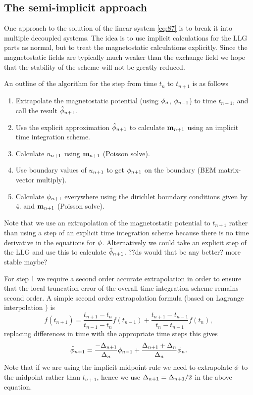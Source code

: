 \subsection{The semi-implicit approach}
\label{sec:semi-implicit-bem}

One approach to the solution of the linear system \cref{eq:87} is to break it into multiple decoupled systems.
The idea is to use implicit calculations for the LLG parts as normal, but to treat the magnetostatic calculations explicitly.
Since the magnetostatic fields are typically much weaker than the exchange field we hope that the stability of the scheme will not be greatly reduced.

An outline of the algorithm for the step from time $t_n$ to $t_{n+1}$ is as follows
\begin{enumerate}
\item Extrapolate the magnetostatic potential (using $\phi_n$, $\phi_{n-1}$) to time $t_{n+1}$, and call the result $\hat{\phi}_{n+1}$.
\item Use the explicit approximation $\hat{\phi}_{n+1}$ to calculate $\boldsymbol{\mathrm{m}}_{n+1}$ using an implicit time integration scheme.
\item Calculate $u_{n+1}$ using $\boldsymbol{\mathrm{m}}_{n+1}$ (Poisson solve).
\item Use boundary values of $u_{n+1}$ to get $\phi_{n+1}$ on the boundary (BEM matrix-vector multiply).
\item Calculate $\phi_{n+1}$ everywhere using the dirichlet boundary conditions given by 4. and $\boldsymbol{\mathrm{m}}_{n+1}$ (Poisson solve).
\end{enumerate}
Note that we use an extrapolation of the magnetostatic potential to $t_{n+1}$ rather than using a step of an explicit time integration scheme because there is no time derivative in the equations for $\phi$.
Alternatively we could take an explicit step of the LLG and use this to calculate $\hat{\phi}_{n+1}$. ??ds would that be any better? more stable maybe?

For step 1 we require a second order accurate extrapolation in order to ensure that the local truncation error of the overall time integration scheme remains second order.
A simple second order extrapolation formula (based on Lagrange interpolation \cite[312]{Kincaid2002}) is
\begin{equation}
  \label{eq:65}
  f(t_{n+1}) = \frac{t_{n+1} - t_n}{t_{n-1} - t_n}f(t_{n-1}) + \frac{t_{n+1} - t_{n-1}}{t_n - t_{n-1}}f(t_n),
\end{equation}
replacing differences in time with the appropriate time steps this gives
\begin{equation}
  \label{eq:66}
  \hat{\phi}_{n+1} = \frac{-\Delta_{n+1}}{\Delta_{n}} \phi_{n-1} + \frac{\Delta_{n+1} + \Delta_{n}}{\Delta_{n}} \phi_n.
\end{equation}
Note that if we are using the implicit midpoint rule we need to extrapolate $\phi$ to the midpoint rather than $t_{n+1}$, hence we use $\Delta_{n+1} = \Delta_{n+1} /2$ in the above equation.


